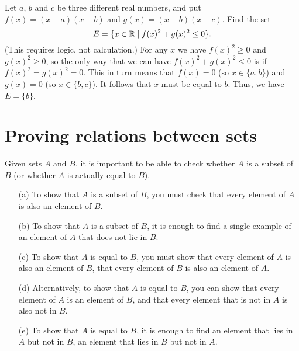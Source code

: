 \documentclass[a4paper]{book}
\theoremstyle{definition}
\newenvironment{starex}{
 \renewcommand{\thetheorem}{\arabic{chapter}.\arabic{section}.\arabic{theorem}${}^*$}
 \exercise
}{\endexercise}
\renewenvironment{solution}{\SolutionInline}{\endSolutionInline}
\begin{document}
\begin{starex}
 Let $a$, $b$ and $c$ be three different real numbers, and put
 $f(x)=(x-a)(x-b)$ and $g(x)=(x-b)(x-c)$.  Find the set 
 \[ E = \{ x\in{\mathbb{R}} \;|\; f(x)^2 + g(x)^2 \leq 0\}. \]
 (This requires logic, not calculation.)
\end{starex}
\begin{solution}
 For any $x$ we have $f(x)^2\geq 0$ and $g(x)^2\geq 0$, so the only
 way that we can have $f(x)^2+g(x)^2\leq 0$ is if $f(x)^2=g(x)^2=0$.
 This in turn means that $f(x)=0$ (so $x\in\{a,b\}$) and $g(x)=0$ (so
 $x\in\{b,c\}$).  It follows that $x$ must be equal to $b$.  Thus, we
 have $E=\{b\}$.
\end{solution}

\section{Proving relations between sets}

Given sets $A$ and $B$, it is important to be able to check whether
$A$ is a subset of $B$ (or whether $A$ is actually equal to $B$).
\begin{itemize}
 \item[(a)] To show that $A$ is a subset of $B$, you must check that
  every element of $A$ is also an element of $B$.
 \item[(b)] To show that $A$ is  a subset of $B$, it is
  enough to find a single example of an element of $A$ that does not
  lie in $B$.
 \item[(c)] To show that $A$ is equal to $B$, you must show that every
  element of $A$ is also an element of $B$,  that every
  element of $B$ is also an element of $A$.
 \item[(d)] Alternatively, to show that $A$ is equal to $B$, you can
  show that every element of $A$ is an element of $B$, and that every
  element that is not in $A$ is also not in $B$.
 \item[(e)] To show that $A$ is  equal to $B$, it is enough
  to find  an element that lies in $A$ but not in $B$,
   an element that lies in $B$ but not in $A$.
\end{itemize}
\end{document}
